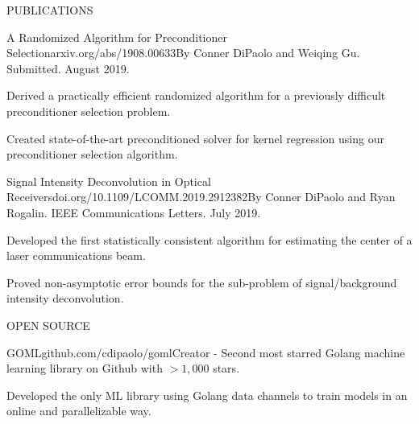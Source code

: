 \documentclass{resume} %
\begin{document}

\begin{rSection}{PUBLICATIONS}

\begin{rSubsection}{A Randomized Algorithm for Preconditioner Selection}{\textsf{arxiv.org/abs/1908.00633}}{By Conner DiPaolo and Weiqing Gu. Submitted. August 2019.}

\item Derived a practically efficient randomized algorithm for a previously difficult preconditioner selection problem.
\item Created state-of-the-art preconditioned solver for kernel regression using our preconditioner selection algorithm.
\end{rSubsection}

\begin{rSubsection}{Signal Intensity Deconvolution in Optical Receivers}{\textsf{doi.org/10.1109/LCOMM.2019.2912382}}{By Conner DiPaolo and Ryan Rogalin. IEEE Communications Letters. July 2019.}

\item Developed the first statistically consistent algorithm for estimating the center of a laser communications beam.
\item Proved non-asymptotic error bounds for the sub-problem of signal/background intensity deconvolution.
\end{rSubsection}


\end{rSection}


\begin{rSection}{OPEN SOURCE}

\begin{rSubsection}{GOML}{\textsf{github.com/cdipaolo/goml}}{Creator - Second most starred Golang machine learning library on Github with $> 1,000$ stars.}

\item Developed the only ML library using Golang data channels to train models in an online and parallelizable way.
\end{rSubsection}

\end{rSection}
\end{document}
